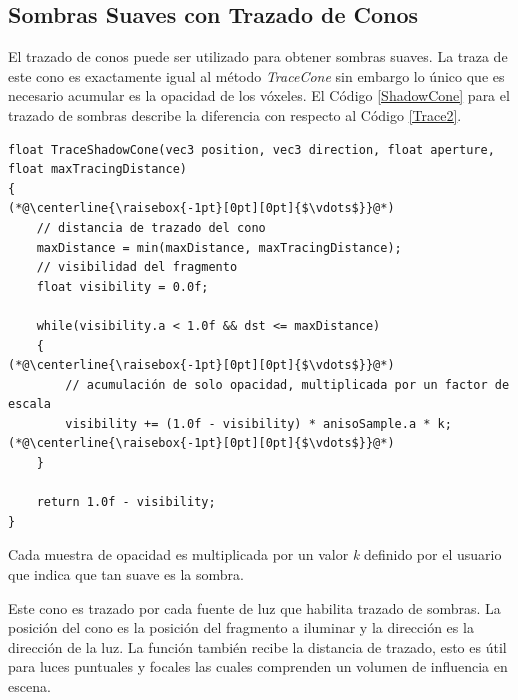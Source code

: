 \subsection{Sombras Suaves con Trazado de Conos} %
\label{sub:sombras_con_trazado_de_conos}
El trazado de conos puede ser utilizado para obtener sombras suaves. La traza de este cono es exactamente igual al método \emph{TraceCone} sin embargo lo único que es necesario acumular es la opacidad de los vóxeles. El Código \ref{ShadowCone} para el trazado de sombras describe la diferencia con respecto al Código \ref{Trace2}.
\\
\begin{lstlisting}[caption={Trazado de sombras con conos.}, label=ShadowCone]
float TraceShadowCone(vec3 position, vec3 direction, float aperture, float maxTracingDistance)
{
(*@\centerline{\raisebox{-1pt}[0pt][0pt]{$\vdots$}}@*)
    // distancia de trazado del cono
    maxDistance = min(maxDistance, maxTracingDistance);
    // visibilidad del fragmento
    float visibility = 0.0f;
    
    while(visibility.a < 1.0f && dst <= maxDistance)
    {
(*@\centerline{\raisebox{-1pt}[0pt][0pt]{$\vdots$}}@*)
        // acumulación de solo opacidad, multiplicada por un factor de escala
        visibility += (1.0f - visibility) * anisoSample.a * k;
(*@\centerline{\raisebox{-1pt}[0pt][0pt]{$\vdots$}}@*)
    }

    return 1.0f - visibility;
}
\end{lstlisting}

Cada muestra de opacidad es multiplicada por un valor \emph{k} definido por el usuario que indica que tan suave es la sombra.

Este cono es trazado por cada fuente de luz que habilita trazado de sombras. La posición del cono es la posición del fragmento a iluminar y la dirección es la dirección de la luz. La función también recibe la distancia de trazado, esto es útil para luces puntuales y focales las cuales comprenden un volumen de influencia en escena.

